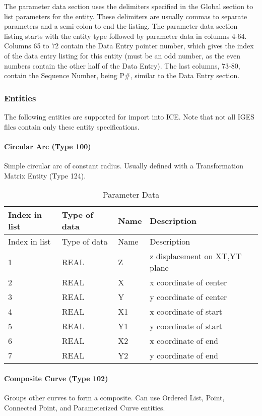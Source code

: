 The parameter data section uses the delimiters specified in the Global
section to list parameters for the entity. These delimiters are usually
commas to separate parameters and a semi-colon to end the listing. The
parameter data section listing starts with the entity type followed by
parameter data in columns 4-64. Columns 65 to 72 contain the Data Entry
pointer number, which gives the index of the data entry listing for this
entity (must be an odd number, as the even numbers contain the other
half of the Data Entry). The last columns, 73-80, contain the Sequence
Number, being P\#, similar to the Data Entry section.

\subsubsection{Entities}\label{entities}

The following entities are supported for import into ICE. Note that not
all IGES files contain only these entity specifications.

\paragraph{Circular Arc (Type 100)}\label{circular-arc-type-100}

Simple circular arc of constant radius. Usually defined with a
Transformation Matrix Entity (Type 124).

\begin{longtable}[c]{@{}llll@{}}
\caption{Parameter Data}\tabularnewline
\toprule
Index in list & Type of data & Name & Description\tabularnewline
\midrule
\endfirsthead
\toprule
Index in list & Type of data & Name & Description\tabularnewline
\midrule
\endhead
1 & REAL & Z & z displacement on XT,YT plane\tabularnewline
2 & REAL & X & x coordinate of center\tabularnewline
3 & REAL & Y & y coordinate of center\tabularnewline
4 & REAL & X1 & x coordinate of start\tabularnewline
5 & REAL & Y1 & y coordinate of start\tabularnewline
6 & REAL & X2 & x coordinate of end\tabularnewline
7 & REAL & Y2 & y coordinate of end\tabularnewline
\bottomrule
\end{longtable}

\paragraph{Composite Curve (Type 102)}\label{composite-curve-type-102}

Groups other curves to form a composite. Can use Ordered List, Point,
Connected Point, and Parameterized Curve entities.

